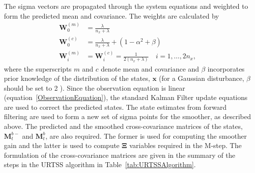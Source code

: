 \documentclass[]{article}
\begin{document}
The sigma vectors are propagated through the system equations and weighted to form the predicted mean and covariance. The weights are calculated by 
\begin{align}
	\mathbf W_0^{(m)}&=\frac{\lambda}{ n_x+\lambda} \\
	\mathbf W_0^{(c)}&=\frac{\lambda}{ n_x+\lambda}+(1-\alpha^2+\beta) \\
	\mathbf W_i^{(m)}&=\mathbf W_i^{(c)}=\frac{1}{2( n_x+\lambda)} \quad i=1, \dots, 2n_x, 
\end{align}
where the superscripts $m$ and $c$ denote mean and covariance and $\beta$ incorporates prior knowledge of the distribution of the states, $\mathbf{x}$ (for a Gaussian disturbance, $\beta$ should be set to 2 \cite{Haykin2001}). Since the observation equation is linear (equation~\ref{ObservationEquation}), the standard Kalman Filter update equations are used to correct the predicted states. The state estimates from forward filtering are used to form a new set of sigma points for the smoother, as described above. The predicted and the smoothed cross-covariance matrices of the states, $\mathbf M_{t}^{b-}$ and  $\mathbf M_{t}^{b}$, are also required. The former is used  for computing the smoother gain and the latter is used to compute $\boldsymbol\Xi$ variables required  in the M-step. The formulation of the cross-covariance matrices are given in the summary of the steps in the URTSS algorithm in Table~\ref{tab:URTSSAlgorithm}.  
\end{document}
